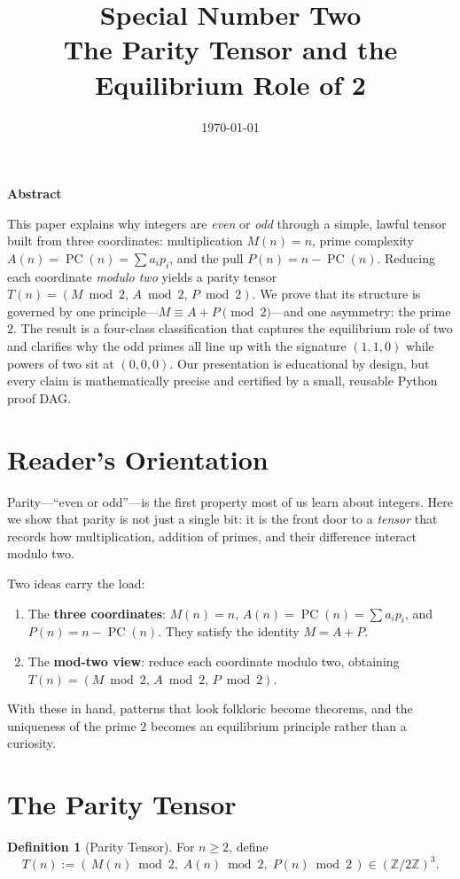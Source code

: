 \documentclass[11pt,a4paper]{article}
\title{Special Number Two\\\large The Parity Tensor and the Equilibrium Role of 2}
\author{}
\date{\today}
\numberwithin{equation}{section}
\numberwithin{figure}{section}
\numberwithin{table}{section}
\theoremstyle{plain}
\theoremstyle{definition}
\newtheorem{definition}[theorem]{Definition}
\theoremstyle{remark}
\newcommand{\Z}{\mathbb{Z}}
\DeclareMathOperator{\PC}{PC}  %
\renewenvironment{abstract}{%
  \thispagestyle{empty}%
  \vspace*{0.08\textheight}%
  \begin{center}%
    \begin{minipage}{0.85\textwidth}%
      \centering\bfseries Abstract\par\medskip
}{%
    \end{minipage}%
  \end{center}%
  \vspace*{0.06\textheight}%
  \clearpage%
}
\begin{document}
\maketitle

\begin{abstract}
This paper explains why integers are \emph{even} or \emph{odd} through a simple, lawful tensor built from three coordinates: multiplication \(M(n)=n\), prime complexity \(A(n)=\PC(n)=\sum a_i p_i\), and the pull \(P(n)=n-\PC(n)\). Reducing each coordinate \emph{modulo two} yields a parity tensor \(T(n)=(M\bmod 2,\,A\bmod 2,\,P\bmod 2)\). We prove that its structure is governed by one principle—\(M\equiv A+P\pmod 2\)—and one asymmetry: the prime \(2\). The result is a four-class classification that captures the equilibrium role of two and clarifies why the odd primes all line up with the signature \((1,1,0)\) while powers of two sit at \((0,0,0)\). Our presentation is educational by design, but every claim is mathematically precise and certified by a small, reusable Python proof DAG.
\end{abstract}

\tableofcontents

\section{Reader's Orientation}
Parity—``even or odd''—is the first property most of us learn about integers. Here we show that parity is not just a single bit: it is the front door to a \emph{tensor} that records how multiplication, addition of primes, and their difference interact modulo two.

Two ideas carry the load:
\begin{enumerate}[leftmargin=*]
  \item The \textbf{three coordinates}: \(M(n)=n\), \(A(n)=\PC(n)=\sum a_i p_i\), and \(P(n)=n-\PC(n)\). They satisfy the identity \(M=A+P\).
  \item The \textbf{mod-two view}: reduce each coordinate modulo two, obtaining \(T(n)=(M\bmod 2,\,A\bmod 2,\,P\bmod 2)\).
\end{enumerate}
With these in hand, patterns that look folkloric become theorems, and the uniqueness of the prime \(2\) becomes an equilibrium principle rather than a curiosity.

\section{The Parity Tensor}
\begin{definition}[Parity Tensor]
For \(n\ge 2\), define
\[
T(n) := (\,M(n) \bmod 2,\; A(n) \bmod 2,\; P(n) \bmod 2\,) \in (\Z/2\Z)^3.
\]
\end{definition}
\end{document}
